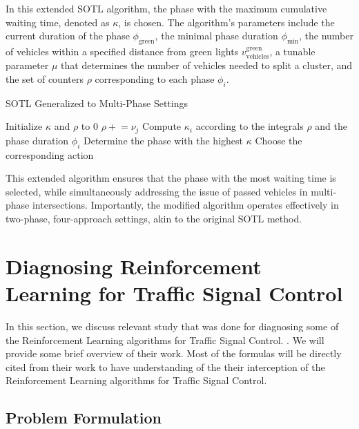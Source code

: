 In this extended SOTL algorithm, the phase with the maximum cumulative waiting time, denoted as \(\kappa\), is chosen. The algorithm's parameters include the current duration of the phase \(\phi_{\text{green}}\), the minimal phase duration \(\phi_{\text{min}}\), the number of vehicles within a specified distance from green lights \(v_{\text{vehicles}}^{\text{green}}\), a tunable parameter \(\mu\) that determines the number of vehicles needed to split a cluster, and the set of counters \(\rho\) corresponding to each phase \(\phi_i\).

\begin{algorithm}
\caption{SOTL Generalized to Multi-Phase Settings\cite{kanis2021deep}}
\label{alg:sotl_multi_phase}
\begin{algorithmic}
\State Initialize \(\kappa\) and \(\rho\) to 0
        \State \(\rho \mathrel{+}= \nu_j\)
    \EndFor
        \State Compute \(\kappa_i\) according to the integrals \(\rho\) and the phase duration \(\phi_i\)
    \EndFor
        \State Determine the phase with the highest \(\kappa\)
        \State Choose the corresponding action
    \EndIf
\EndFor
\end{algorithmic}
\end{algorithm}

This extended algorithm ensures that the phase with the most waiting time is selected, while simultaneously addressing the issue of passed vehicles in multi-phase intersections. Importantly, the modified algorithm operates effectively in two-phase, four-approach settings, akin to the original SOTL method.


\section{Diagnosing Reinforcement Learning for Traffic Signal Control}
In this section, we discuss relevant study that was done for diagnosing some of the Reinforcement Learning algorithms for Traffic Signal Control. \cite{zheng2019diagnosing}. We will provide some brief overview of their work. Most of the formulas will be directly cited from their work to have understanding of the their interception of the Reinforcement Learning algorithms for Traffic Signal Control.

\subsection{Problem Formulation}

